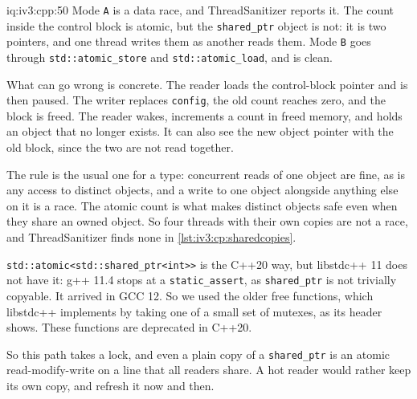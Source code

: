 \begin{solution}{iq:iv3:cpp:50}
Mode \texttt{A} is a data race, and ThreadSanitizer reports it. The count inside the control block is atomic, but the \texttt{shared\_ptr} object is not: it is two pointers, and one thread writes them as another reads them. Mode \texttt{B} goes through \texttt{std::atomic\_store} and \texttt{std::atomic\_load}, and is clean.

What can go wrong is concrete. The reader loads the control-block pointer and is then paused. The writer replaces \texttt{config}, the old count reaches zero, and the block is freed. The reader wakes, increments a count in freed memory, and holds an object that no longer exists. It can also see the new object pointer with the old block, since the two are not read together.

The rule is the usual one for a type: concurrent reads of one object are fine, as is any access to distinct objects, and a write to one object alongside anything else on it is a race. The atomic count is what makes distinct objects safe even when they share an owned object. So four threads with their own copies are not a race, and ThreadSanitizer finds none in \cref{lst:iv3:cp:sharedcopies}.
\enlargethispage{-6\baselineskip}%
\label{lst:iv3:cp:sharedcopies}

\texttt{std::atomic<std::shared\_ptr<int>{}>} is the C++20 way, but libstdc++ 11 does not have it: g++ 11.4 stops at a \texttt{static\_assert}, as \texttt{shared\_ptr} is not trivially copyable. It arrived in GCC 12. So we used the older free functions, which libstdc++ implements by taking one of a small set of mutexes, as its header shows. These functions are deprecated in C++20.

So this path takes a lock, and even a plain copy of a \texttt{shared\_ptr} is an atomic read-modify-write on a line that all readers share. A hot reader would rather keep its own copy, and refresh it now and then.

\end{solution}


